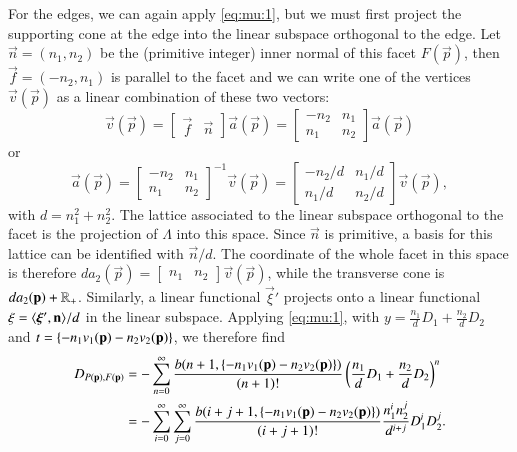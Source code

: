 For the edges, we can again apply \eqref{eq:mu:1}, but we
must first project the supporting cone at the edge into
the linear subspace orthogonal to the edge.
Let $\vec n = (n_1, n_2)$ be the (primitive integer) inner normal
of this facet $F(\vec p)$, then $\vec f = (-n_2, n_1)$ is parallel
to the facet and we can write one of the vertices $\vec v(\vec p)$
as a linear combination of these two vectors:
\begin{equation}
\label{eq:EML:facet:coordinates}
\vec v(\vec p)
=
\begin{bmatrix}
\vec f & \vec n
\end{bmatrix}
\vec a(\vec p)
=
\begin{bmatrix}
-n_2 & n_1 \\
n_1 & n_2
\end{bmatrix}
\vec a(\vec p)
\end{equation}
or
\begin{equation}
\label{eq:EML:facet:coordinates:2}
\vec a(\vec p)
=
\begin{bmatrix}
-n_2 & n_1 \\
n_1 & n_2
\end{bmatrix}^{-1}
\vec v(\vec p)
=
\begin{bmatrix}
-n_2/d & n_1/d \\
n_1/d & n_2/d
\end{bmatrix}
\vec v(\vec p),
\end{equation}
with $d = n_1^2+n_2^2$.
The lattice associated to the linear subspace orthogonal
to the facet is the projection of $\Lambda$ into this space.
Since $\vec n$ is primitive, a basis for this lattice can be
identified with $\vec n/d$.
The coordinate of the whole facet in this space is therefore
$
d a_2(\vec p) =
\begin{bmatrix}
n_1 & n_2
\end{bmatrix}
\vec v(\vec p)
$, while the transverse cone is $d a_2(\vec p) + \RR_+$.
Similarly, a linear functional $\vec \xi'$ projects onto
a linear functional $\xi = \sp {\xi'} n/d$ in the linear subspace.
Applying \eqref{eq:mu:1}, with $y = \frac{n_1}d D_1 + \frac{n_2}d D_2$
and $t = \fractional{- n_1 v_1(\vec p) - n_2 v_2(\vec p)}$, we therefore
find
\begin{align*}
D_{P(\vec p), F(\vec p)}
& =
-\sum_{n=0}^\infty
    \frac{b(n+1, \fractional{-n_1 v_1(\vec p) - n_2 v_2(\vec p)})}{(n+1)!}
	\left(\frac{n_1}d D_1 + \frac{n_2}d D_2\right)^n
\\
& =
- \sum_{i=0}^\infty \sum_{j=0}^\infty
    \frac{b(i+j+1, \fractional{-n_1 v_1(\vec p) - n_2 v_2(\vec p)})}{(i+j+1)!}
	\frac{n_1^i n_2^j}{d^{i+j}} D_1^i D_2^j
.
\end{align*}

